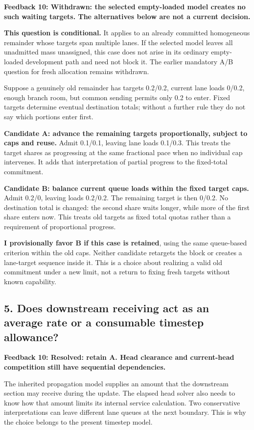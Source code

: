 \documentclass[11pt,a4paper]{article}
\begin{document}
\textbf{Feedback 10: Withdrawn: the selected empty-loaded model creates no such waiting targets. The alternatives below are not a current decision.}

\textbf{This question is conditional.} It applies to an already committed homogeneous remainder whose targets span multiple lanes. If the selected model leaves all unadmitted mass unassigned, this case does not arise in its ordinary empty-loaded development path and need not block it. The earlier mandatory A/B question for fresh allocation remains withdrawn.

Suppose a genuinely old remainder has targets 0.2/0.2, current lane loads 0/0.2, enough branch room, but common sending permits only 0.2 to enter. Fixed targets determine eventual destination totals; without a further rule they do not say which portions enter first.

\textbf{Candidate A: advance the remaining targets proportionally, subject to caps and reuse.} Admit 0.1/0.1, leaving lane loads 0.1/0.3. This treats the target shares as progressing at the same fractional pace when no individual cap intervenes. It adds that interpretation of partial progress to the fixed-total commitment.

\textbf{Candidate B: balance current queue loads within the fixed target caps.} Admit 0.2/0, leaving loads 0.2/0.2. The remaining target is then 0/0.2. No destination total is changed: the second share waits longer, while more of the first share enters now. This treats old targets as fixed total quotas rather than a requirement of proportional progress.

\textbf{I provisionally favor B if this case is retained}, using the same queue-based criterion within the old caps. Neither candidate retargets the block or creates a lane-target sequence inside it. This is a choice about realizing a valid old commitment under a new limit, not a return to fixing fresh targets without known capability.

\subsection*{5. Does downstream receiving act as an average rate or a consumable timestep allowance?}

\textbf{Feedback 10: Resolved: retain A. Head clearance and current-head competition still have sequential dependencies.}

The inherited propagation model supplies an amount that the downstream section may receive during the update. The elapsed head solver also needs to know how that amount limits its internal service calculation. Two conservative interpretations can leave different lane queues at the next boundary. This is why the choice belongs to the present timestep model.
\end{document}
